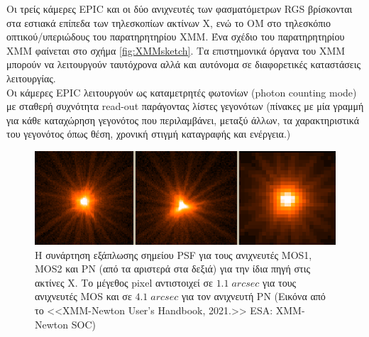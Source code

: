 Οι τρείς κάμερες \textlatin{EPIC} και οι δύο ανιχνευτές των φασματόμετρων \textlatin{RGS} βρίσκονται στα εστιακά επίπεδα των τηλεσκοπίων ακτίνων Χ, ενώ το ΟΜ στο τηλεσκόπιο οπτικού/υπεριώδους του παρατηρητηρίου \textlatin{XMM.} Ένα σχέδιο του παρατηρητηρίου \textlatin{XMM} φαίνεται στο σχήμα \ref{fig:XMMsketch}. Τα επιστημονικά όργανα του \textlatin{XMM} μπορούν να λειτουργούν ταυτόχρονα αλλά και αυτόνομα σε διαφορετικές καταστάσεις λειτουργίας.\\
Οι κάμερες \textlatin{EPIC} λειτουργούν ως καταμετρητές φωτονίων \textlatin{(photon counting mode)} με σταθερή συχνότητα  \textlatin{read-out} παράγοντας λίστες γεγονότων (πίνακες με μία γραμμή για κάθε καταχώρηση γεγονότος που περιλαμβάνει, μεταξύ άλλων, τα χαρακτηριστικά του γεγονότος όπως θέση, χρονική στιγμή καταγραφής και ενέργεια.)\\ 
\begin{figure}
 \begin{center}
 \includegraphics[width=0.9\linewidth]{Figures/PSFs.png}
 \caption{Η συνάρτηση εξάπλωσης σημείου \textlatin{PSF} για τους ανιχνευτές \textlatin{MOS1}, \textlatin{MOS2} και ΡΝ (από τα αριστερά στα δεξιά) για την ίδια πηγή στις ακτίνες Χ. Το μέγεθος \textlatin{pixel} αντιστοιχεί σε $1.1\; arcsec$ για τους ανιχνευτές \textlatin{MOS} και σε $4.1\;arcsec$ για τον ανιχνευτή ΡΝ (Εικόνα από το <<\textlatin{XMM-Newton User's Handbook, 2021.}>> \textlatin{ESA: XMM-Newton SOC})}
 \label{fig:PSFs}
 \end{center}
 \end{figure}
